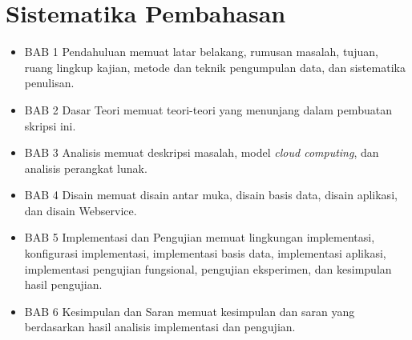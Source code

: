 \section{Sistematika Pembahasan}
\label{sec:sistematikapembahasan}

\begin{itemize}
	\item BAB 1 Pendahuluan memuat latar belakang, rumusan masalah, tujuan, ruang lingkup kajian, metode dan teknik pengumpulan data, dan sistematika penulisan.
	\item BAB 2 Dasar Teori memuat teori-teori yang menunjang dalam pembuatan skripsi ini.
	\item BAB 3 Analisis memuat deskripsi masalah, model \textit{cloud computing}, dan analisis perangkat lunak.
	\item BAB 4 Disain memuat disain antar muka, disain basis data, disain aplikasi, dan disain Webservice.
	\item BAB 5 Implementasi dan Pengujian memuat lingkungan implementasi, konfigurasi implementasi, implementasi basis data, implementasi aplikasi, implementasi pengujian fungsional, pengujian eksperimen, dan kesimpulan hasil pengujian.
	\item BAB 6 Kesimpulan dan Saran memuat kesimpulan dan saran yang berdasarkan hasil analisis implementasi dan pengujian.
\end{itemize}
